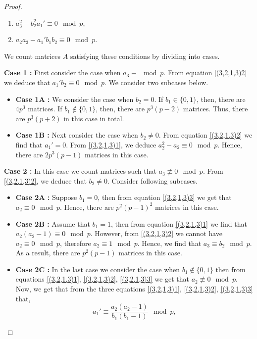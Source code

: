 \documentclass[a4paper]{amsart}
\numberwithin{equation}{section}
\theoremstyle{remark}
\begin{document}
\begin{proof}
\begin{enumerate}
    \item $a_3^2-b_2^2a_1' \equiv 0 \mod p$,
    \item $a_2a_3-a_1'b_1b_2 \equiv 0 \mod p.$
    \end{enumerate}
    We count matrices $A$ satisfying these conditions by dividing into cases.
    \par \textbf{Case 1 :} First consider the case when $a_3 \equiv \mod p$. From equation \eqref{(3,2,1,3)2} we deduce that $a_1'b_2 \equiv 0 \mod p$. We consider two subcases below.
    \begin{itemize}
        \item \textbf{Case 1A :} We consider the case when $b_2 = 0$. If $b_1 \in \{0,1\}$, then, there are $4p^3$ matrices. If $b_1 \notin \{0,1\}$, then, there are $p^3(p-2)$ matrices. Thus, there are $p^3(p+2)$ in this case in total.
        \item \textbf{Case 1B :} Next consider the case when $b_2 \neq 0$. From equation \eqref{(3,2,1,3)2} we find that $a_1' = 0$. From \eqref{(3,2,1,3)1}, we deduce $a_2^2-a_2 \equiv 0 \mod p$. Hence, there are $2p^3(p-1)$ matrices in this case.
    \end{itemize}
    \par \textbf{Case 2 :} In this case we count matrices such that $a_3 \not\equiv 0 \mod p$. From \eqref{(3,2,1,3)2}, we deduce that $b_2 \neq 0$. Consider following subcases.
    \begin{itemize}
        \item \textbf{Case 2A :} Suppose $b_1 = 0$, then from equation \eqref{(3,2,1,3)3} we get that $a_2 \equiv 0 \mod p$. Hence, there are $p^2(p-1)^2$ matrices in this case.
        \item \textbf{Case 2B :} Assume that $b_1 = 1$, then from equation \eqref{(3,2,1,3)1} we find that $a_2(a_2-1) \equiv 0 \mod p$. However, from \eqref{(3,2,1,3)2} we cannot have $a_2 \equiv 0 \mod p$, therefore $a_2 \equiv 1 \mod p$. Hence, we find that $a_3 \equiv b_2 \mod p$. As a result, there are $p^2(p-1)$ matrices in this case.
        \item \textbf{Case 2C :} In the last case we consider the case when $b_1 \notin \{0,1\}$ then from equations \eqref{(3,2,1,3)1}, \eqref{(3,2,1,3)2}, \eqref{(3,2,1,3)3} we get that $a_2 \not\equiv 0 \mod p$. Now, we get that from the three equations \eqref{(3,2,1,3)1}, \eqref{(3,2,1,3)2}, \eqref{(3,2,1,3)3} that,
        \begin{equation*}
            a_1' \equiv \frac{a_2(a_2-1)}{b_1(b_1-1)} \mod p,
        \end{equation*}

\end{itemize}
\end{proof}
\end{document}
